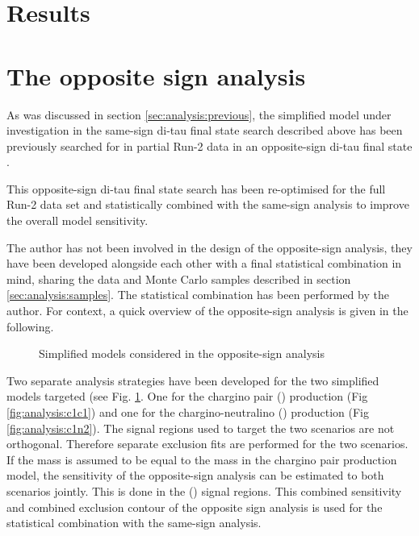 \section{Results}
\label{sec:analysis:results}


\FloatBarrier
\section{The opposite sign analysis}
\label{sec:analysis:os}
As was discussed in section \ref{sec:analysis:previous},  the simplified model under investigation in the same-sign di-tau final state search described above has been previously searched for in partial Run-2 data in an opposite-sign di-tau final state \cite{DiTauC1N2_2018}. 

This opposite-sign di-tau final state search has been re-optimised for the full Run-2 data set and statistically combined with the same-sign analysis to improve the overall model sensitivity. 

The author has not been involved in the design of the opposite-sign analysis,  they have been developed alongside each other with a final statistical combination in mind,  sharing the data and Monte Carlo samples described in section \ref{sec:analysis:samples}. 
The statistical combination has been performed by the author.  For context, a quick overview of the opposite-sign analysis is given in the following. 

\begin{figure}[htpb!]\centering
{}
\caption{Simplified models considered in the opposite-sign analysis  \label{fig:analysis:osmodels}}
\end{figure}

Two separate analysis strategies have been developed for the two simplified models targeted (see Fig. \ref{fig:analysis:osmodels}.  One for the chargino pair (\Cone\Cone) production (Fig \ref{fig:analysis:c1c1}) and one for the chargino-neutralino (\Cone\Ntwo) production (Fig \ref{fig:analysis:c1n2}).  The signal regions used to target the two scenarios are not orthogonal.  Therefore separate exclusion fits are performed for the two scenarios.  If the \Cone mass is assumed to be equal to the \Ntwo mass in the chargino pair production model,  the sensitivity of the opposite-sign analysis can be estimated to both scenarios jointly.  This is done in the (\Cone\Ntwo) signal regions.  This combined sensitivity and combined exclusion contour of the opposite sign analysis is used for the statistical combination with the same-sign analysis. 


